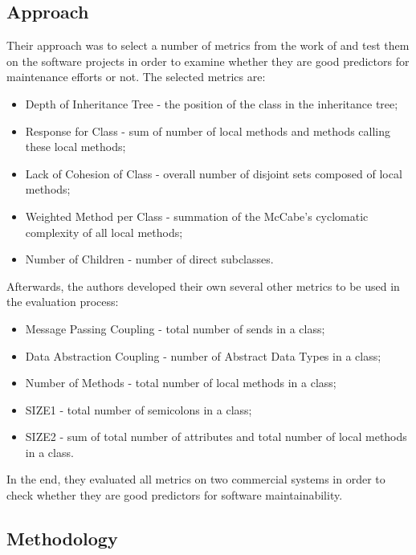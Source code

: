 \documentclass[a4paper,portrait,12pt]{article}
\begin{document}
\subsection{Approach}

Their approach was to select a number of metrics from the work of 
\citet{chidamber1994metrics} and test them on the software projects in 
order to examine whether they are good predictors for maintenance efforts 
or not. The selected metrics are:

 \begin{itemize}
  \item Depth of Inheritance Tree - the position of the class in the inheritance tree;
  \item Response for Class - sum of number of local methods and methods calling these
    local methods;
  \item Lack of Cohesion of Class - overall number of disjoint sets composed of 
    local methods;
  \item Weighted Method per Class - summation of the McCabe's cyclomatic complexity
    of all local methods;
  \item Number of Children - number of direct subclasses.
 \end{itemize}

Afterwards, the authors developed their own several other metrics to be used in the 
evaluation process:

 \begin{itemize}
  \item Message Passing Coupling - total number of sends in a class;
  \item Data Abstraction Coupling - number of Abstract Data Types in a class;
  \item Number of Methods - total number of local methods in a class;
  \item SIZE1 - total number of semicolons in a class;
  \item SIZE2 - sum of total number of attributes and total number of local methods 
    in a class.
 \end{itemize}

In the end, they evaluated all metrics on two commercial systems in order to check
whether they are good predictors for software maintainability.

\subsection{Methodology}
\end{document}
